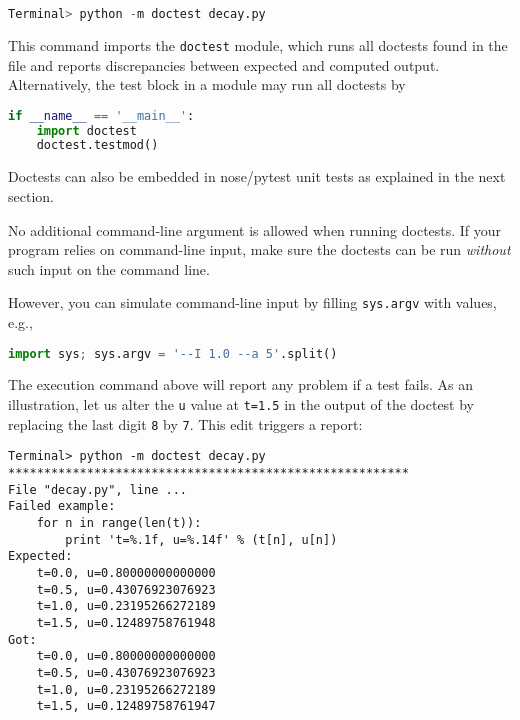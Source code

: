 \documentclass[graybox,sectrefs,envcountresetchap,open=right,final]{svmonodo}
\newenvironment{warning_mdfboxadmon}[1][]{
\begin{warning_mdfboxmdframed}[frametitle=#1]
}
{
\end{warning_mdfboxmdframed}
}
\begin{document}
\begin{lstlisting}[language=Python,style=blue1_bluegreen]
Terminal> python -m doctest decay.py
\end{lstlisting}
This command imports the \texttt{doctest} module, which runs all
doctests found in the file and reports discrepancies between
expected and computed output.
Alternatively, the test block in a module may run all doctests
by

\begin{lstlisting}[language=Python,style=blue1_bluegreen]
if __name__ == '__main__':
    import doctest
    doctest.testmod()
\end{lstlisting}
Doctests can also be embedded in nose/pytest unit tests
as explained in the next section.


\begin{warning_mdfboxadmon}
No additional command-line argument is allowed when running doctests.
If your program relies on command-line input, make sure the doctests
can be run \emph{without} such input on the command line.

However, you can simulate command-line input by filling \texttt{sys.argv}
with values, e.g.,

\begin{lstlisting}[language=Python,style=blue1_bluegreen]
import sys; sys.argv = '--I 1.0 --a 5'.split()
\end{lstlisting}
\end{warning_mdfboxadmon}



The execution command above will report any problem if a test fails.
As an illustration, let us alter the \texttt{u} value at \texttt{t=1.5} in
the output of the doctest by replacing the last digit \texttt{8} by \texttt{7}.
This edit triggers a report:

\begin{Verbatim}[frame=lines,label=\fbox{{\tiny Terminal}},framesep=2.5mm,framerule=0.7pt,fontsize=\fontsize{9pt}{9pt}]
Terminal> python -m doctest decay.py
********************************************************
File "decay.py", line ...
Failed example:
    for n in range(len(t)):
        print 't=%.1f, u=%.14f' % (t[n], u[n])
Expected:
    t=0.0, u=0.80000000000000
    t=0.5, u=0.43076923076923
    t=1.0, u=0.23195266272189
    t=1.5, u=0.12489758761948
Got:
    t=0.0, u=0.80000000000000
    t=0.5, u=0.43076923076923
    t=1.0, u=0.23195266272189
    t=1.5, u=0.12489758761947
\end{Verbatim}
\end{document}
